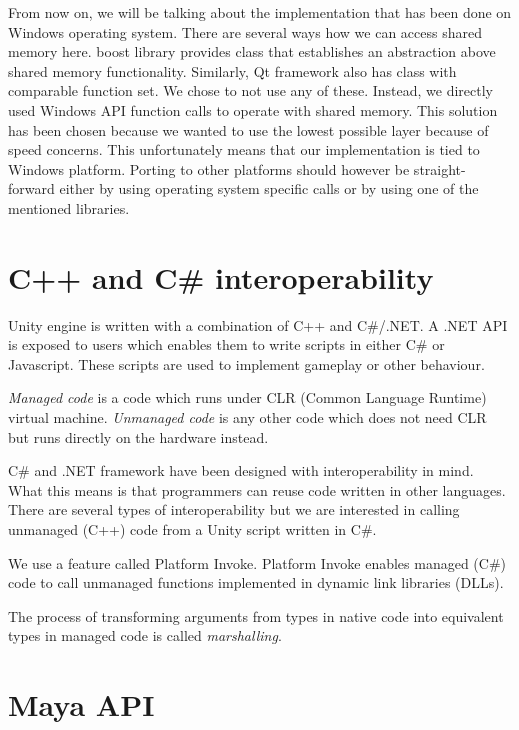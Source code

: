 \documentclass[
  digital, %
  table,   %
  nolof,     %
  nolot,     %
]{fithesis3}
\begin{document}
From now on, we will be talking about the implementation that has been done on Windows operating system. There are several ways how we can access shared memory here. boost library provides class that establishes an abstraction above shared memory functionality. Similarly, Qt framework also has class with comparable function set. We chose to not use any of these. Instead, we directly used Windows API function calls to operate with shared memory. This solution has been chosen because we wanted to use the lowest possible layer because of speed concerns. This unfortunately means that our implementation is tied to Windows platform. Porting to other platforms should however be straight-forward either by using operating system specific calls or by using one of the mentioned libraries.

\section{C++ and C\# interoperability}
Unity engine is written with a combination of C++ and C\#/.NET. A .NET API is exposed to users which enables them to write scripts in either C\# or Javascript. These scripts are used to implement gameplay or other behaviour.

\textit{Managed code} is a code which runs under CLR (Common Language Runtime) virtual machine. \textit{Unmanaged code} is any other code which does not need CLR but runs directly on the hardware instead.

C\# and .NET framework have been designed with interoperability in mind. What this means is that programmers can reuse code written in other languages. There are several types of interoperability but we are interested in calling unmanaged (C++) code from a Unity script written in C\#.

We use a feature called Platform Invoke. Platform Invoke enables managed (C\#) code to call unmanaged functions implemented in dynamic link libraries (DLLs).

The process of transforming arguments from types in native code into equivalent types in managed code is called \textit{marshalling}.


\section{Maya API}
\end{document}
